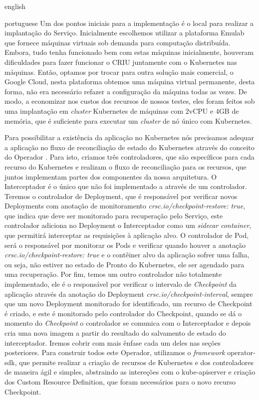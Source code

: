 \begin{otherlanguage*}{english}
\begin{otherlanguage*}{portuguese}
Um dos pontos iniciais para a implementação é o local para realizar a implantação do
Serviço. Inicialmente escolhemos utilizar a plataforma Emulab \cite{White+:osdi02}
que fornece máquinas virtuais sob demanda para computação distribuída. Embora, tudo
tenha funcionado bem com estas máquinas inicialmente, houveram dificuldades para
fazer funcionar o CRIU juntamente com o Kubernetes nas máquinas. Então, optamos por
trocar para outra solução mais comercial, o Google Cloud, nesta plataforma obtemos
uma máquina virtual permanente, desta forma, não era necessário refazer a configuração
da máquina todas as vezes. De modo, a economizar nos custos dos recursos de nossos testes,
eles foram feitos sob uma implantação em \textit{cluster} Kubernetes de máquinas com 2vCPU e 4GB
de memória, que é suficiente para executar um \textit{cluster} de nó único com Kubernetes.

Para possibilitar a existência da aplicação no Kubernetes nós precisamos adequar a
aplicação no fluxo de reconciliação de estado do Kubernetes através do conceito do Operador
\cite{kubernetes:operator}. Para isto, criamos três controladores, que são específicos para
cada recurso do Kubernetes e realizam o fluxo de reconciliação para os recursos, que juntos
implementam partes dos componentes da nossa arquitetura. O Interceptador é o único que não
foi implementado a através de um controlador. Teremos o controlador de Deployment, que é
responsável por verificar novos Deployments com anotação de monitoramento
\textit{crsc.io/checkpoint-restore: true}, que indica que deve ser monitorado para
recuperação pelo Serviço, este controlador adiciona no Deployment o Interceptador como
um \textit{sidecar container}, que permitirá interceptar as requisições à aplicação alvo.
O controlador de Pod, será o responsável por monitorar os Pods e verificar quando houver a
anotação \textit{crsc.io/checkpoint-restore: true} e o contêiner alvo da aplicação sofrer
uma falha, ou seja, não estiver no estado de Pronto do Kubernetes, ele ser agendado para
uma recuperação. Por fim, temos um outro controlador não totalmente
implementado, ele é o responsável por verificar o intervalo de \textit{Checkpoint} da
aplicação através da anotação do Deployment \textit{crsc.io/checkpoint-interval}, sempre
que um novo Deployment monitorado for identificado, um recurso de Checkpoint é criado, e este
é monitorado pelo controlador do Checkpoint, quando se dá o momento do \textit{Checkpoint}
o controlador se comunica com o Interceptador e depois cria uma nova imagem a partir do
resultado do salvamento de estado do interceptador. Iremos cobrir com mais ênfase cada um
deles nas seções posteriores. Para construir todos este Operador, utilizamos o \textit{framework}
operator-sdk, que permite realizar a criação de recursos de Kubernetes e dos controladores
de maneira ágil e simples, abstraindo as intereções com o kube-apiserver e criação dos
Custom Resource Definition, que foram necessários para o novo recurso Checkpoint.


\end{otherlanguage*}
\end{otherlanguage*}
